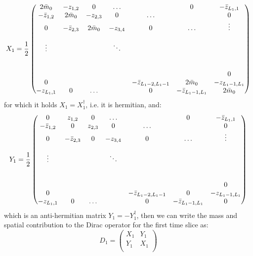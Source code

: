 \begin{equation}
    X_1 = \frac{1}{2} \begin{pmatrix}
        2 \Bar{m}_0 & - z_{1,2} & 0 & \dots & & 0 & - \Bar{z}_{L_1, 1} \\
        - \Bar{z}_{1,2} & 2 \Bar{m}_0 & - z_{2,3} & 0 & \dots & & 0 \\
        0 & - \Bar{z}_{2,3} & 2 \Bar{m}_0 & - z_{3,4} & 0 & \dots & \vdots \\
        \\
        \vdots & & & \ddots \\
        \\
        \\
        & & & & & & 0 \\
        0 & & & & - \Bar{z}_{L_1 - 2, L_1 - 1} & 2 \Bar{m}_0 & - z_{L_1 - 1, L_1} \\
        - z_{L_1, 1} & 0 & \dots & & 0 & - \Bar{z}_{L_1 - 1, L_1} & 2 \Bar{m}_0 \\ 
    \end{pmatrix}
\end{equation}
for which it holds $X_1 = X_1^{\dagger}$, i.e. it is hermitian, and:
\begin{equation}
    Y_1 = \frac{1}{2} \begin{pmatrix}
        0 & z_{1,2} & 0 & \dots & & 0 & - \Bar{z}_{L_1, 1} \\
        - \Bar{z}_{1,2} & 0 & z_{2,3} & 0 & \dots & & 0 \\
        0 & - \Bar{z}_{2,3} & 0 & - z_{3,4} & 0 & \dots & \vdots \\
        \\
        \vdots & & & \ddots \\
        \\
        \\
        & & & & & & 0 \\
        0 & & & & - \Bar{z}_{L_1 - 2, L_1 - 1} & 0 & - z_{L_1 - 1, L_1} \\
        - z_{L_1, 1} & 0 & \dots & & 0 & - \Bar{z}_{L_1 - 1, L_1} & 0 \\ 
    \end{pmatrix}
\end{equation}
which is an anti-hermitian matrix $Y_1 = - Y_1^\dagger$, then we can write the mass and spatial contribution to the Dirac operator for the first time slice as:
\begin{equation}
    D_1 = \begin{pmatrix}
        X_1 & Y_1 \\
        Y_1 & X_1 \\
    \end{pmatrix}
\end{equation}
